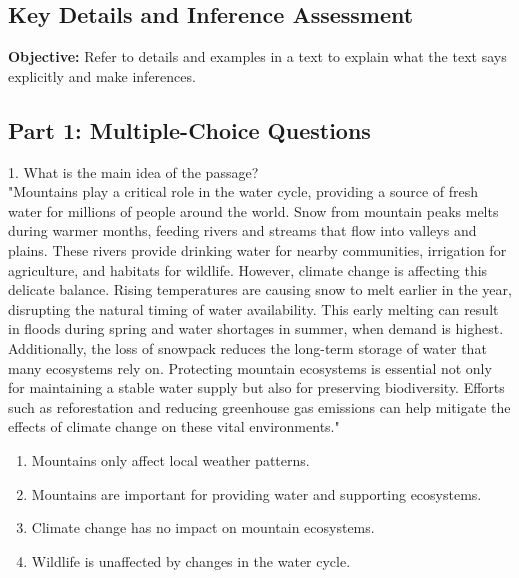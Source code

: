 \documentclass[12pt]{article}
\begin{document}
\subsection*{Key Details and Inference Assessment}
\onehalfspacing

\begin{tcolorbox}[colframe=black!40, colback=gray!0, title=Learning Objective]
\textbf{Objective:} Refer to details and examples in a text to explain what the text says explicitly and make inferences.
\end{tcolorbox}

\subsection*{Part 1: Multiple-Choice Questions}

1. What is the main idea of the passage?\\
"Mountains play a critical role in the water cycle, providing a source of fresh water for millions of people around the world. Snow from mountain peaks melts during warmer months, feeding rivers and streams that flow into valleys and plains. These rivers provide drinking water for nearby communities, irrigation for agriculture, and habitats for wildlife. However, climate change is affecting this delicate balance. Rising temperatures are causing snow to melt earlier in the year, disrupting the natural timing of water availability. This early melting can result in floods during spring and water shortages in summer, when demand is highest. Additionally, the loss of snowpack reduces the long-term storage of water that many ecosystems rely on. Protecting mountain ecosystems is essential not only for maintaining a stable water supply but also for preserving biodiversity. Efforts such as reforestation and reducing greenhouse gas emissions can help mitigate the effects of climate change on these vital environments."\\
\begin{enumerate}[label=\Alph*.]
    \item Mountains only affect local weather patterns.  
    \item Mountains are important for providing water and supporting ecosystems.  
    \item Climate change has no impact on mountain ecosystems.  
    \item Wildlife is unaffected by changes in the water cycle.  
\end{enumerate}
\end{document}
